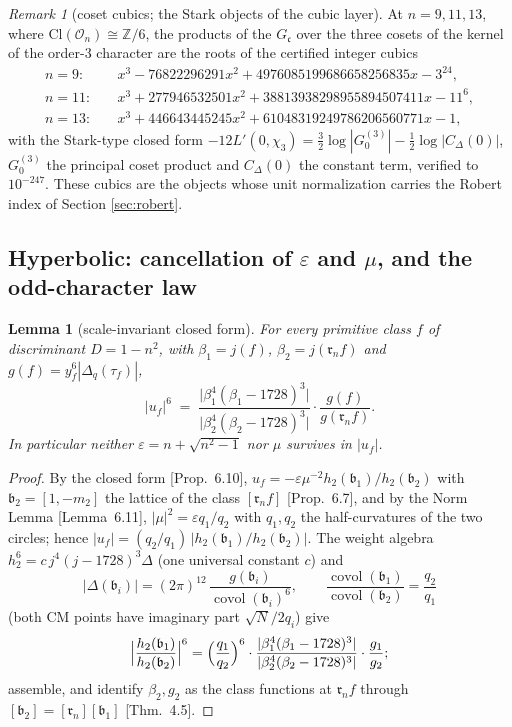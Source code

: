 \documentclass[11pt]{amsart}
\numberwithin{equation}{section}
\theoremstyle{plain}
\newtheorem{lemma}[theorem]{Lemma}
\theoremstyle{definition}
\theoremstyle{remark}
\newtheorem{remark}[theorem]{Remark}
\newcommand{\Z}{\mathbb{Z}}
\newcommand{\Cl}{\mathrm{Cl}}
\newcommand{\idealb}{\mathfrak{b}}
\newcommand{\idealc}{\mathfrak{c}}
\newcommand{\idealr}{\mathfrak{r}}
\newcommand{\covol}{\operatorname{covol}}
\newcommand{\lat}[1]{\left[#1\right]}
\newcommand{\Oc}{\mathcal{O}}
\newcommand{\eps}{\varepsilon}
\newcommand{\PaperI}{\cite{SchmidtI}}
\begin{document}
\begin{remark}[coset cubics; the Stark objects of the cubic layer]
\label{rem:cosetcubics}
At $n = 9, 11, 13$, where $\Cl(\Oc_n) \cong \Z/6$, the products of the
$G_\idealc$ over the three cosets of the kernel of the order-$3$
character are the roots of the certified integer cubics
\begin{align*}
n = 9:&\quad x^3 - 76822296291x^2 + 4976085199686658256835x - 3^{24},\\
n = 11:&\quad x^3 + 277946532501x^2 + 38813938298955894507411x - 11^{6},\\
n = 13:&\quad x^3 + 446643445245x^2 + 61048319249786206560771x - 1,
\end{align*}
with the Stark-type closed form
$-12L'(0,\chi_3) = \tfrac32\log|G^{(3)}_0| - \tfrac12\log|C_\Delta(0)|$,
$G^{(3)}_0$ the principal coset product and $C_\Delta(0)$ the constant
term, verified to $10^{-247}$.  These cubics are the objects whose unit
normalization carries the Robert index of Section \ref{sec:robert}.
\end{remark}

\subsection{Hyperbolic: cancellation of $\eps$ and $\mu$, and the
odd-character law}\label{subsec:hyp-master}

\begin{lemma}[scale-invariant closed form]\label{lem:hyp-classwise}
For every primitive class $f$ of discriminant $D = 1 - n^2$, with
$\beta_1 = j(f)$, $\beta_2 = j(\idealr_nf)$ and $g(f) =
y_f^6|\Delta_q(\tau_f)|$,
\[
  |u_f|^{6} \;=\;
  \frac{\bigl|\beta_1^4(\beta_1 - 1728)^3\bigr|}
       {\bigl|\beta_2^4(\beta_2 - 1728)^3\bigr|}\cdot
  \frac{g(f)}{g(\idealr_nf)} .
\]
In particular neither $\eps = n + \sqrt{n^2-1}$ nor $\mu$ survives in
$|u_f|$.
\end{lemma}

\begin{proof}
By the closed form \PaperI[Prop.~6.10], $u_f = -\eps\mu^{-2}h_2(\idealb_1)
/h_2(\idealb_2)$ with $\idealb_2 = \lat{1, -m_2}$ the lattice of the class
$[\idealr_nf]$ \PaperI[Prop.~6.7], and by the Norm Lemma
\PaperI[Lemma~6.11], $|\mu|^2 = \eps q_1/q_2$ with $q_1, q_2$ the
half-curvatures of the two circles; hence $|u_f| =
(q_2/q_1)\,|h_2(\idealb_1)/h_2(\idealb_2)|$.  The weight algebra $h_2^6 =
c\,j^4(j - 1728)^3\Delta$ (one universal constant $c$) and
\[
  |\Delta(\idealb_i)| = (2\pi)^{12}\,\frac{g(\idealb_i)}{\covol(\idealb_i)^6},
  \qquad
  \frac{\covol(\idealb_1)}{\covol(\idealb_2)} = \frac{q_2}{q_1}
\]
(both CM points have imaginary part $\sqrt N/2q_i$) give
\[
  \Bigl|\frac{h_2(\idealb_1)}{h_2(\idealb_2)}\Bigr|^{6}
  = \Bigl(\frac{q_1}{q_2}\Bigr)^{6}\cdot
  \frac{|\beta_1^4(\beta_1-1728)^3|}{|\beta_2^4(\beta_2-1728)^3|}\cdot
  \frac{g_1}{g_2} ;
\]
assemble, and identify $\beta_2, g_2$ as the class functions at
$\idealr_nf$ through $[\idealb_2] = [\idealr_n][\idealb_1]$
\PaperI[Thm.~4.5].
\end{proof}
\end{document}

